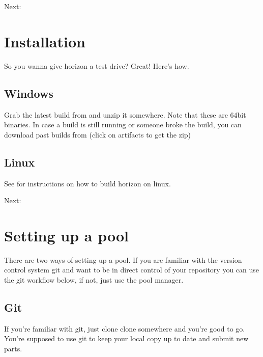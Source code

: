 \documentclass[letterpaper,10pt,czech]{sphinxmanual}
\begin{document}
Next: {\hyperref[\detokenize{installation::doc}]{}}


\chapter{Installation}
\label{\detokenize{installation:installation}}\label{\detokenize{installation::doc}}
So you wanna give horizon a test drive? Great! Here’s how.


\section{Windows}
\label{\detokenize{installation:windows}}
Grab the latest build from 
and unzip it somewhere. Note that these are 64bit binaries. In case a
build is still running or someone broke the build, you can download past
builds from
(click on artifacts to get the zip)


\section{Linux}
\label{\detokenize{installation:linux}}
See {\hyperref[\detokenize{build-linux::doc}]{}} for
instructions on how to build horizon on linux.

Next: {\hyperref[\detokenize{pool-setup::doc}]{}}


\chapter{Setting up a pool}
\label{\detokenize{pool-setup:setting-up-a-pool}}\label{\detokenize{pool-setup::doc}}
There are two ways of setting up a pool. If you are familiar with the version control system git and want to be in direct control of your repository you can use the git workflow below, if not, just use the pool manager.


\section{Git}
\label{\detokenize{pool-setup:git}}
If you’re familiar with git, just clone clone
somewhere and you’re good to go. You’re supposed to use git to keep your
local copy up to date and submit new parts.
\end{document}
